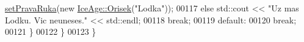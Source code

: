 \begin{DoxyCode}
      \hyperlink{classIceAge_1_1ObleceneVybaveniVeverky_a81c50b90cae451476735b88f3cdecb07}{setPravaRuka}(\textcolor{keyword}{new} \hyperlink{classIceAge_1_1Orisek}{IceAge::Orisek}(\textcolor{stringliteral}{"Lodka"}));
00117                         \textcolor{keywordflow}{else} std::cout << \textcolor{stringliteral}{"Uz mas Lodku. Vic neuneses."} << std::endl;
00118                     \textcolor{keywordflow}{break};
00119                 \textcolor{keywordflow}{default}:
00120                     \textcolor{keywordflow}{break};
00121             \}
00122         \}
00123 \}
\end{DoxyCode}
